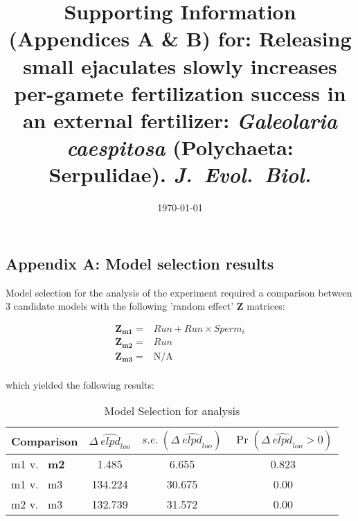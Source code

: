 \documentclass{article}
\title{Supporting Information (Appendices A \& B) for: Releasing small ejaculates slowly increases per-gamete fertilization success in an external fertilizer: \textit{Galeolaria caespitosa} (Polychaeta: Serpulidae). \textit{J.~Evol.~Biol.}}
\date{\today}
\begin{document}
\maketitle

\bigskip

\bigskip

\newpage


\subsection*{Appendix A: Model selection results}
\renewcommand{\theequation}{S\arabic{equation}}
\setcounter{equation}{0}
\renewcommand{\thefigure}{S\arabic{figure}}
\setcounter{figure}{0}
\renewcommand{\thetable}{S\arabic{table}}
\setcounter{table}{0}


Model selection for the analysis of the  experiment required a comparison between 3 candidate models with the following 'random effect' $\mathbf{Z}$ matrices:

\begin{align*}
	\mathbf{Z_{m1}} = &Run + Run \times Sperm_i \\
	\mathbf{Z_{m2}} = &Run \\
	\mathbf{Z_{m3}} = &\text{N/A} \\
\end{align*}

\noindent{} which yielded the following results: 

\begin{table}[!ht]
\caption{Model Selection for  analysis}
\label{Table:InvestModComp}
\centering
\begin{tabular}{l c c c } \hline
Comparison & $\Delta~\widehat{\textit{elpd}}_{\textit{loo}}$ & $s.e.~(\Delta~\widehat{\textit{elpd}}_{\textit{loo}})$ & $\Pr(\Delta~\widehat{\textit{elpd}}_{\textit{loo}} > 0)$ \\
\hline
m1 v.~ \textbf{m2}  & 1.485   & 6.655  & 0.823 \\
m1 v.~ m3 & 134.224 & 30.675 & 0.00  \\
m2 v.~ m3 & 132.739 & 31.572 & 0.00  \\
\hline
\end{tabular}
\bigskip{}
\end{table}
\bigskip
\end{document}
